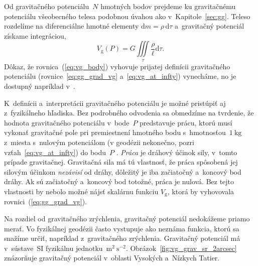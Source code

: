 \documentclass[a4paper, 12pt]{book}
\newcommand{\diff}{\mathrm d}
\newcommand{\gidx}{\mathrm g}
\begin{document}
Od gravitačného potenciálu~$N$ hmotných bodov prejdeme ku
gravitačnému potenciálu všeobecného telesa podobnou úvahou ako
v~Kapitole~\ref{sec:gg}.  Teleso rozdelíme na diferenciálne hmotné elementy
$\diff m = \rho \, \diff \tau$ a~gravitačný potenciál získame integráciou,
%
\begin{equation}
\label{eq:vg_body}
V_\gidx(P) = G \iiint\limits_{\tau} \frac{\rho}{\ell} \diff\tau{.}
\end{equation}
%
Dôkaz, že rovnica~(\ref{eq:vg_body}) vyhovuje prijatej definícii gravitačného
potenciálu (rovnice~\ref{eq:gg_grad_vg} a~\ref{eq:vg_at_infty}) vynecháme, no 
je
dostupný napríklad v~\textcite{MacMillan1930}.

K~definícii a~interpretácii gravitačného potenciálu je možné pristúpiť aj 
z~fyzikálneho hľadiska.  Bez podrobného odvodenia sa obmedzíme na tvrdenie, že 
hodnota gravitačného potenciálu v~bode~$P$ predstavuje prácu, ktorú musí 
vykonať gravitačné pole pri premiestnení hmotného bodu s~hmotnosťou~$1\ 
\mathrm{kg}$ z~miesta s~nulovým potenciálom (v geodézii nekonečno, pozri 
vzťah~\ref{eq:vg_at_infty}) do bodu~$P$ 
\parencite{MacMillan1930,Kellogg1967,TorgeGeodesy}.  \emph{Práca} je dráhový 
účinok sily, v~tomto prípade gravitačnej.  Gravitačná sila má tú vlastnosť, že 
práca spôsobená jej silovým účinkom \emph{nezávisí} od dráhy, dôležitý je iba 
začiatočný a~koncový bod dráhy.  Ak sú začiatočný a~koncový bod totožné, práca 
je nulová.  Bez tejto vlastnosti by nebolo možné nájsť skalárnu funkciu 
$V_\gidx$, ktorá by vyhovovala rovnici~(\ref{eq:gg_grad_vg}).

Na rozdiel od gravitačného zrýchlenia, gravitačný potenciál nedokážeme
priamo merať.  Vo fyzikálnej geodézii často vystupuje ako neznáma funkcia,
ktorú sa snažíme určiť, napríklad z~gravitačného zrýchlenia.  Gravitačný 
potenciál má v~sústave~SI fyzikálnu jednotku~$\mathrm{m}^2\ \mathrm{s}^{-2}$.
Obrázok~\ref{fig:vg_grav_sr_2arcsec} znázorňuje gravitačný potenciál v~oblasti 
Vysokých a~Nízkych Tatier.
\end{document}

